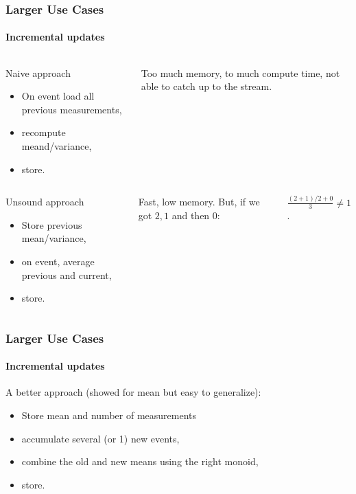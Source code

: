 \documentclass{beamer}
\begin{document}
\begin{framej}
\begin{frame}
\end{frame}

\begin{frame}
  \frametitle{Larger Use Cases}
  \framesubtitle{Incremental updates}
  \begin{columns}[c]
      \begin{block}{Naive approach}
        \begin{itemize}
        \item On event load all previous measurements,
        \item recompute meand/variance,
        \item store.
        \end{itemize}
      \end{block}

  Too much \alert{memory}, to much compute \alert{time}, not able to \alert{catch up}
  to the stream.
  \end{columns}

  \pause

  \begin{columns}[c]
      \begin{block}{Unsound approach}
        \begin{itemize}
        \item Store previous mean/variance,
        \item on event, average previous and current,
        \item store.
        \end{itemize}
      \end{block}

    Fast, low memory. But, if we got \(2,1\) and then \(0\):

    \alert{\(\frac{(2 + 1) / 2 + 0}{3} \neq 1\).}
  \end{columns}
\end{frame}

\begin{frame}
  \frametitle{Larger Use Cases}
  \framesubtitle{Incremental updates}
  A better approach (showed for mean but easy to generalize):

  \begin{itemize}
  \item Store mean and number of measurements
  \item accumulate several (or 1) new events,
  \item combine the old and new means using the right \alert{monoid},
  \item store.
  \end{itemize}


\end{frame}
\end{framej}
\end{document}
